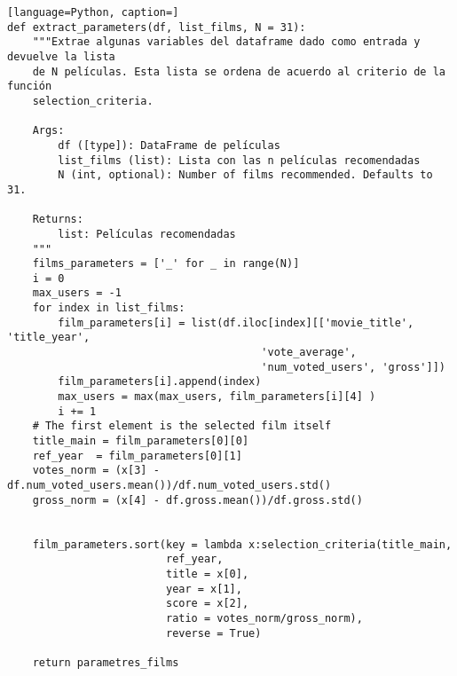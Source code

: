 \begin{lstlisting}[language=Python, caption=]
def extract_parameters(df, list_films, N = 31):
    """Extrae algunas variables del dataframe dado como entrada y devuelve la lista
    de N películas. Esta lista se ordena de acuerdo al criterio de la función 
    selection_criteria.

    Args:
        df ([type]): DataFrame de películas
        list_films (list): Lista con las n películas recomendadas
        N (int, optional): Number of films recommended. Defaults to 31.

    Returns:
        list: Películas recomendadas
    """
    films_parameters = ['_' for _ in range(N)]
    i = 0
    max_users = -1
    for index in list_films:
        film_parameters[i] = list(df.iloc[index][['movie_title', 'title_year',
                                        'vote_average', 
                                        'num_voted_users', 'gross']])
        film_parameters[i].append(index)
        max_users = max(max_users, film_parameters[i][4] )
        i += 1
    # The first element is the selected film itself
    title_main = film_parameters[0][0]
    ref_year  = film_parameters[0][1]
    votes_norm = (x[3] - df.num_voted_users.mean())/df.num_voted_users.std()
    gross_norm = (x[4] - df.gross.mean())/df.gross.std()

    
    film_parameters.sort(key = lambda x:selection_criteria(title_main,
                         ref_year, 
                         title = x[0], 
                         year = x[1],
                         score = x[2], 
                         ratio = votes_norm/gross_norm),
                         reverse = True)
    
    return parametres_films
\end{lstlisting}


